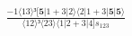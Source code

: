 \documentclass[varwidth, border=5pt]{standalone}
\begin{document}
\begin{my}
$\begin{gathered}
\scriptscriptstyle\frac{-1⟨13⟩³[𝟓|1+3|2⟩⟨2|1+3|𝟓|𝟓⟩}{⟨12⟩³⟨23⟩⟨1|2+3|4]s_{123}}
\end{gathered}$
\end{my}
\end{document}
